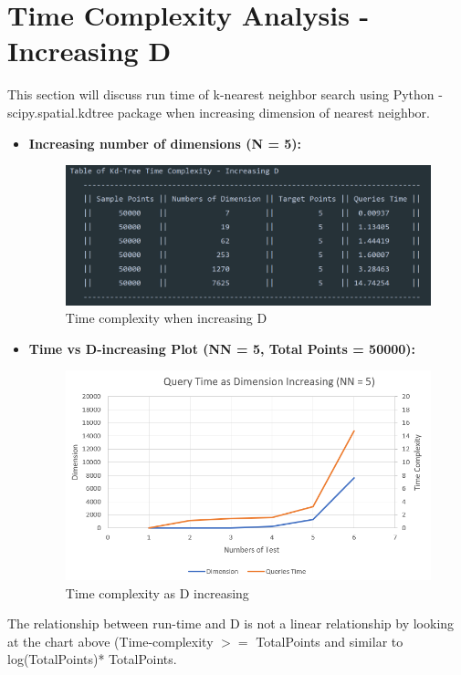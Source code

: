 \documentclass[12pt]{article}
\newcommand\tab[1][0.6cm]{\hspace*{#1}}
\begin{document}
 	\section{\large Time Complexity Analysis - Increasing D}
 	\tab This section will discuss run time of k-nearest neighbor search using Python - scipy.spatial.kdtree package when increasing dimension of nearest neighbor.
 	\begin{itemize}
    \item \textbf{Increasing number of dimensions (N = 5):} 
    \begin{figure}[H]
    	\centering
    	\includegraphics[width=14cm]{k-nearest-D-increase.png}
    	\caption{Time complexity when increasing D} 
    	\label{fig:3}
    \end{figure}
    \item \textbf{Time vs D-increasing Plot (NN = 5, Total Points = 50000):}
    \begin{figure}[H]
    	\centering
    	\includegraphics[width=14cm]{excel-D.PNG}
    	\caption{Time complexity as D increasing} 
    	\label{fig:4}
    \end{figure}
    \end{itemize}
    \tab The relationship between run-time and D is not a linear relationship by looking at the chart above (Time-complexity $>=$ TotalPoints and similar to log(TotalPoints)* TotalPoints.
\end{document}
